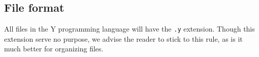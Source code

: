 \subsection{File format}

All files in the Y programming language will have the \texttt{.y}
extension. Though this extension serve no purpose, we advise the
reader to stick to this rule, as is it much better for organizing files.
